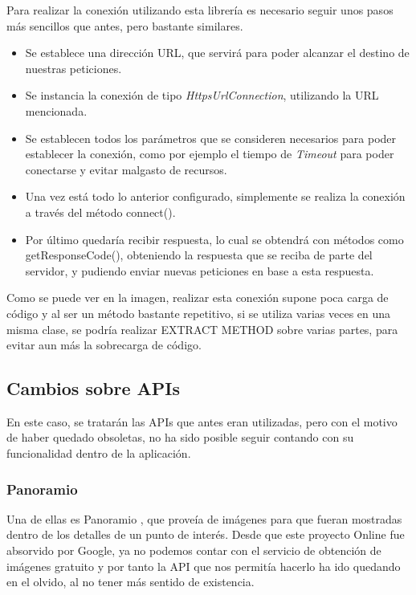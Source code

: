 Para realizar la conexión utilizando esta librería es necesario seguir unos pasos más sencillos que antes, pero bastante similares.

\begin{itemize}
\item Se establece una dirección URL, que servirá para poder alcanzar el destino de nuestras peticiones.
\item Se instancia la conexión de tipo \textit{HttpsUrlConnection}, utilizando la URL mencionada.
\item Se establecen todos los parámetros que se consideren necesarios para poder establecer la conexión, como por ejemplo el tiempo de \textit{Timeout} para poder conectarse y evitar malgasto de recursos.
\item Una vez está todo lo anterior configurado, simplemente se realiza la conexión a través del método connect().
\item Por último quedaría recibir respuesta, lo cual se obtendrá con métodos como getResponseCode(), obteniendo la respuesta que se reciba de parte del servidor, y pudiendo enviar nuevas peticiones en base a esta respuesta.
\end{itemize}


Como se puede ver en la imagen, realizar esta conexión supone poca carga de código y al ser un método bastante repetitivo, si se utiliza varias veces en una misma clase, se podría realizar EXTRACT METHOD sobre varias partes, para evitar aun más la sobrecarga de código.

\subsection{Cambios sobre APIs}

En este caso, se tratarán las APIs que antes eran utilizadas, pero con el motivo de haber quedado obsoletas, no ha sido posible seguir contando con su funcionalidad dentro de la aplicación.

\subsubsection{Panoramio}

Una de ellas es Panoramio \cite{panoramio}, que proveía de imágenes para que fueran mostradas dentro de los detalles de un punto de interés. Desde que este proyecto Online fue absorvido por Google, ya no podemos contar con el servicio de obtención de imágenes gratuito y por tanto la API que nos permitía hacerlo ha ido quedando en el olvido, al no tener más sentido de existencia.

